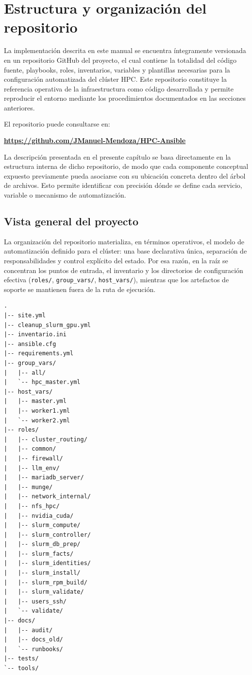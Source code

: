 \section{Estructura y organización del repositorio}

La implementación descrita en este manual se encuentra íntegramente versionada en un repositorio GitHub del proyecto, el cual contiene la totalidad del código fuente, playbooks, roles, inventarios, variables y plantillas necesarias para la configuración automatizada del clúster HPC. Este repositorio constituye la referencia operativa de la infraestructura como código desarrollada y permite reproducir el entorno mediante los procedimientos documentados en las secciones anteriores.

El repositorio puede consultarse en:

\begin{center}
\textbf{\href{https://github.com/JManuel-Mendoza/HPC-Ansible}{https://github.com/JManuel-Mendoza/HPC-Ansible}}
\end{center}

La descripción presentada en el presente capítulo se basa directamente en la estructura interna de dicho repositorio, de modo que cada componente conceptual expuesto previamente pueda asociarse con su ubicación concreta dentro del árbol de archivos. Esto permite identificar con precisión dónde se define cada servicio, variable o mecanismo de automatización.

\subsection{Vista general del proyecto}

La organización del repositorio materializa, en términos operativos, el modelo de automatización definido para el clúster: una base declarativa única, separación de responsabilidades y control explícito del estado. Por esa razón, en la raíz se concentran los puntos de entrada, el inventario y los directorios de configuración efectiva (\texttt{roles/}, \texttt{group\_vars/}, \texttt{host\_vars/}), mientras que los artefactos de soporte se mantienen fuera de la ruta de ejecución.

\begin{verbatim}
.
|-- site.yml
|-- cleanup_slurm_gpu.yml
|-- inventario.ini
|-- ansible.cfg
|-- requirements.yml
|-- group_vars/
|   |-- all/
|   `-- hpc_master.yml
|-- host_vars/
|   |-- master.yml
|   |-- worker1.yml
|   `-- worker2.yml
|-- roles/
|   |-- cluster_routing/
|   |-- common/
|   |-- firewall/
|   |-- llm_env/
|   |-- mariadb_server/
|   |-- munge/
|   |-- network_internal/
|   |-- nfs_hpc/
|   |-- nvidia_cuda/
|   |-- slurm_compute/
|   |-- slurm_controller/
|   |-- slurm_db_prep/
|   |-- slurm_facts/
|   |-- slurm_identities/
|   |-- slurm_install/
|   |-- slurm_rpm_build/
|   |-- slurm_validate/
|   |-- users_ssh/
|   `-- validate/
|-- docs/
|   |-- audit/
|   |-- docs_old/
|   `-- runbooks/
|-- tests/
`-- tools/
\end{verbatim}

